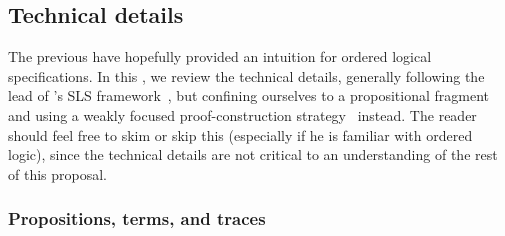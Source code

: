 





% 

\subsection{Technical details}\label{sec:ordered-lp:technical}

The previous  have hopefully provided an intuition for ordered logical specifications.
In this , we review the technical details, generally following the lead of \citeauthor{Simmons:CMU12}'s SLS framework~\autocite*{Simmons:CMU12}, but confining ourselves to a propositional fragment and using a weakly focused proof-construction strategy~\autocite{Simmons+Pfenning:CMU11} instead.
The reader should feel free to skim or skip this  (especially if he is familiar with ordered logic), since the technical details are not critical to an understanding of the rest of this proposal.

\subsubsection{Propositions, terms, and traces}\label{sec:props-terms-traces}

